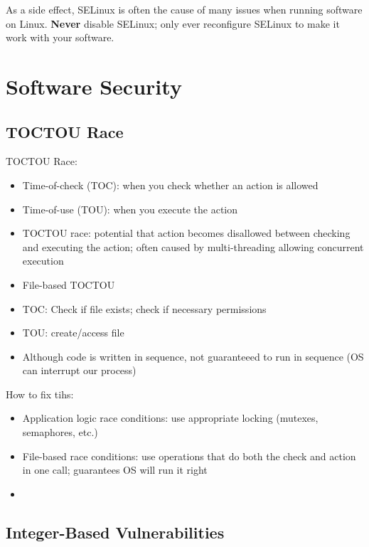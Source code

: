 \documentclass[code]{amznotes}
\begin{document}
As a side effect, SELinux is often the cause of many issues when running software on Linux. \textbf{Never} disable SELinux; only ever reconfigure SELinux to make it work with your software.

\chapter{Software Security}

\section{TOCTOU Race}

TOCTOU Race:
\begin{itemize}
    \item Time-of-check (TOC): when you check whether an action is allowed
    \item Time-of-use (TOU): when you execute the action
    \item TOCTOU race: potential that action becomes disallowed between checking and executing the action; often caused by multi-threading allowing concurrent execution
\end{itemize}

\begin{itemize}
    \item File-based TOCTOU
    \item TOC: Check if file exists; check if necessary permissions
    \item TOU: create/access file
    \item Although code is written in sequence, not guaranteeed to run in sequence (OS can interrupt our process)
\end{itemize}

How to fix tihs:
\begin{itemize}
    \item Application logic race conditions: use appropriate locking (mutexes, semaphores, etc.)
    \item File-based race conditions: use operations that do both the check and action in one call; guarantees OS will run it right
    \item {}
\end{itemize}

\section{Integer-Based Vulnerabilities}
\end{document}
